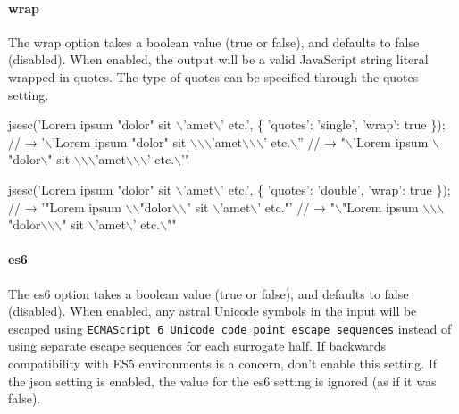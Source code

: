 \paragraph*{{\ttfamily wrap}}

The {\ttfamily wrap} option takes a boolean value ({\ttfamily true} or {\ttfamily false}), and defaults to {\ttfamily false} (disabled). When enabled, the output will be a valid Java\+Script string literal wrapped in quotes. The type of quotes can be specified through the {\ttfamily quotes} setting.


\begin{DoxyCode}
jsesc('Lorem ipsum "dolor" sit \(\backslash\)'amet\(\backslash\)' etc.', \{
  'quotes': 'single',
  'wrap': true
\});
// → '\(\backslash\)'Lorem ipsum "dolor" sit \(\backslash\)\(\backslash\)\(\backslash\)'amet\(\backslash\)\(\backslash\)\(\backslash\)' etc.\(\backslash\)''
// → "\(\backslash\)'Lorem ipsum \(\backslash\)"dolor\(\backslash\)" sit \(\backslash\)\(\backslash\)\(\backslash\)'amet\(\backslash\)\(\backslash\)\(\backslash\)' etc.\(\backslash\)'"

jsesc('Lorem ipsum "dolor" sit \(\backslash\)'amet\(\backslash\)' etc.', \{
  'quotes': 'double',
  'wrap': true
\});
// → '"Lorem ipsum \(\backslash\)\(\backslash\)"dolor\(\backslash\)\(\backslash\)" sit \(\backslash\)'amet\(\backslash\)' etc."'
// → "\(\backslash\)"Lorem ipsum \(\backslash\)\(\backslash\)\(\backslash\)"dolor\(\backslash\)\(\backslash\)\(\backslash\)" sit \(\backslash\)'amet\(\backslash\)' etc.\(\backslash\)""
\end{DoxyCode}


\paragraph*{{\ttfamily es6}}

The {\ttfamily es6} option takes a boolean value ({\ttfamily true} or {\ttfamily false}), and defaults to {\ttfamily false} (disabled). When enabled, any astral Unicode symbols in the input will be escaped using \href{http://mathiasbynens.be/notes/javascript-escapes#unicode-code-point}{\tt E\+C\+M\+A\+Script 6 Unicode code point escape sequences} instead of using separate escape sequences for each surrogate half. If backwards compatibility with E\+S5 environments is a concern, don’t enable this setting. If the {\ttfamily json} setting is enabled, the value for the {\ttfamily es6} setting is ignored (as if it was {\ttfamily false}).


